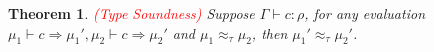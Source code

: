 \documentclass{article}
\newtheorem{theorem}{Theorem}[section]
\newcommand{\redt}[1]{\textcolor{red}{#1}}
\begin{document}
\begin{theorem}
\rm \redt{(Type Soundness)} Suppose $\Gamma \vdash c:\rho$, for any evaluation $\mu_1 \vdash c \Rightarrow \mu_1', \mu_2 \vdash c \Rightarrow \mu_2'$ and $\mu_1 \approx_\tau \mu_2$, then $\mu_1' \approx_\tau \mu_2'$. 
\begin{center}
\end{center}
\end{theorem}
\end{document}
